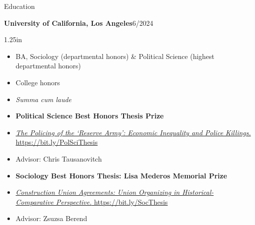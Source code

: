 \documentclass[12pt]{resume} %
\newcommand{\righthandindent}{1.25in}
\begin{document}
\begin{rSection}{Education}

\textbf{University of California, Los Angeles}\hfill{}6/2024
\begin{adjustwidth}{0pt}{\righthandindent}
\vspace{-7pt}
\begin{itemize}
    \item[] BA, Sociology (departmental honors) \& Political Science (highest departmental honors)
    \item[] College honors
    \vspace{-7pt}
    \item[] \textit{Summa cum laude}
    \item[] \textbf{Political Science Best Honors Thesis Prize}
    \vspace{-7pt}
    \item[] \href{https://bit.ly/PolSciThesis}{\textit{The Policing of the `Reserve Army': Economic Inequality and Police Killings.} https://bit.ly/PolSciThesis}
    \vspace{-7pt}
    \item[] Advisor: Chris Tausanovitch
    \item[] \textbf{Sociology Best Honors Thesis: Lisa Mederos Memorial Prize}
    \vspace{-21pt}
    \item[] \href{https://bit.ly/SocThesis}{\textit{Construction Union Agreements: Union Organizing in Historical- \allowbreak Comparative Perspective.} https://bit.ly/SocThesis}
    \vspace{-7pt}
    \item[] Advisor: Zsuzsa Berend

\end{itemize}
\end{adjustwidth}


\end{rSection}
\end{document}
